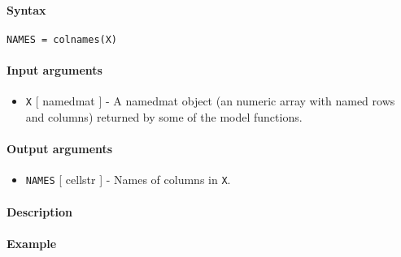 


	\paragraph{Syntax}\label{syntax}

\begin{verbatim}
NAMES = colnames(X)
\end{verbatim}

\paragraph{Input arguments}\label{input-arguments}

\begin{itemize}
\itemsep1pt\parskip0pt
\item
  \texttt{X} {[} namedmat {]} - A namedmat object (an numeric array with
  named rows and columns) returned by some of the model functions.
\end{itemize}

\paragraph{Output arguments}\label{output-arguments}

\begin{itemize}
\itemsep1pt\parskip0pt
\item
  \texttt{NAMES} {[} cellstr {]} - Names of columns in \texttt{X}.
\end{itemize}

\paragraph{Description}\label{description}

\paragraph{Example}\label{example}


